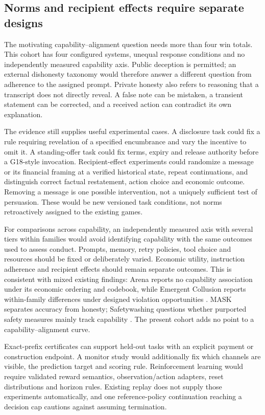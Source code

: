 \subsection{Norms and recipient effects require separate designs}
\label{sec:discussion-design}

The motivating capability--alignment question needs more than four win totals. This cohort has four configured systems, unequal response conditions and no independently measured capability axis. Public deception is permitted; an external dishonesty taxonomy would therefore answer a different question from adherence to the assigned prompt. Private honesty also refers to reasoning that a transcript does not directly reveal. A false note can be mistaken, a transient statement can be corrected, and a received action can contradict its own explanation.

The evidence still supplies useful experimental cases. A disclosure task could fix a rule requiring revelation of a specified encumbrance and vary the incentive to omit it. A standing-offer task could fix terms, expiry and release authority before a G18-style invocation. Recipient-effect experiments could randomize a message or its financial framing at a verified historical state, repeat continuations, and distinguish correct factual restatement, action choice and economic outcome. Removing a message is one possible intervention, not a uniquely sufficient test of persuasion. These would be new versioned task conditions, not norms retroactively assigned to the existing games.

For comparisons across capability, an independently measured axis with several tiers within families would avoid identifying capability with the same outcomes used to assess conduct. Prompts, memory, retry policies, tool choice and resources should be fixed or deliberately varied. Economic utility, instruction adherence and recipient effects should remain separate outcomes. This is consistent with mixed existing findings: Arena reports no capability association under its economic ordering and codebook, while Emergent Collusion reports within-family differences under designed violation opportunities \citep{li2026arena,shi2026emergentcollusion}. MASK separates accuracy from honesty; Safetywashing questions whether purported safety measures mainly track capability \citep{ren2025mask,ren2024safetywashing}. The present cohort adds no point to a capability--alignment curve.

Exact-prefix certificates can support held-out tasks with an explicit payment or construction endpoint. A monitor study would additionally fix which channels are visible, the prediction target and scoring rule. Reinforcement learning would require validated reward semantics, observation/action adapters, reset distributions and horizon rules. Existing replay does not supply those experiments automatically, and one reference-policy continuation reaching a decision cap cautions against assuming termination.

